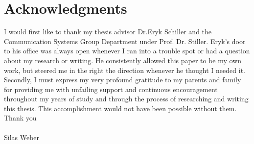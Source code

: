 \chapter*{Acknowledgments}

I would first like to thank my thesis advisor Dr.Eryk Schiller and the Communication Systems Group Department under Prof. Dr. Stiller.
Eryk's door to his office was always open whenever I ran into a trouble spot or had a question about my research or writing.
He consistently allowed this paper to be my own work, but steered me in the right the direction whenever he thought I needed it.
\\
Secondly, I must express my very profound gratitude to my parents and family for providing me with unfailing support and continuous encouragement throughout my years of study and through the process of researching and writing this thesis. 
This accomplishment would not have been possible without them. Thank you
\\
\\
Silas Weber